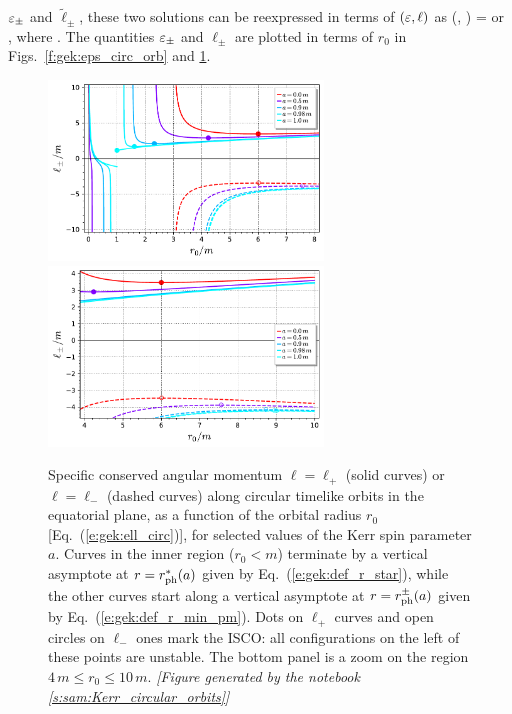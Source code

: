 $\varepsilon_\pm$ and $\tilde{\ell}_\pm$, these two solutions
can be reexpressed in terms of $(\varepsilon,\ell)$ as
\be \label{e:gek:circ_two_sol}
    (\veps, \ell) = \encadre{ (\veps_+, \ell_+)}\quad\mbox{or}\quad
    \encadre{(\veps_-, \ell_-)} ,
\ee
where
\be \label{e:gek:ell_circ}
     .
\ee
The quantities $\varepsilon_\pm$ and $\ell_\pm$ are plotted in terms of $r_0$ in
Figs.~\ref{f:gek:eps_circ_orb} and \ref{f:gek:ell_circ_orb}.
\begin{figure}
\begin{center}
\includegraphics[width=0.65\textwidth]{gek_ell_circ_orb.pdf}\\
\includegraphics[width=0.65\textwidth]{gek_ell_circ_orb_zoom.pdf}
\end{center}
\caption[]{\label{f:gek:ell_circ_orb} \footnotesize
Specific conserved angular momentum $\ell=\ell_+$ (solid curves) or $\ell=\ell_-$
(dashed curves) along circular timelike
orbits in the equatorial plane, as a function of the orbital radius $r_0$
[Eq.~(\ref{e:gek:ell_circ})], for selected values of the Kerr spin parameter $a$.
Curves in the inner region ($r_0 < m$) terminate by a vertical asymptote at $r = r_{\rm ph}^*(a)$ given
by Eq.~(\ref{e:gek:def_r_star}), while the other curves start along a
vertical asymptote at $r = r_{\rm ph}^\pm(a)$ given by Eq.~(\ref{e:gek:def_r_min_pm}).
Dots on $\ell_+$ curves and open circles on $\ell_-$ ones mark the ISCO: all
configurations on the left of these points are unstable.
The bottom panel is a zoom on the region $4\,m \leq r_0 \leq 10\,m$.
\textsl{[Figure generated by the notebook \ref{s:sam:Kerr_circular_orbits}]}
}
\end{figure}
